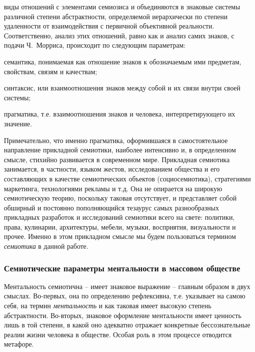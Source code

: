 \begin{enumerate}
  виды отношений с элементами семиозиса и объединяются в знаковые системы различной
  степени абстрактности, определяемой иерархически по степени удаленности от взаимодействия
  с первичной объективной реальности. Соответственно, анализ этих отношений, равно как и анализ
  самих знаков, с подачи Ч.~Морриса, происходит по следующим параметрам:
  \begin{enumerate*}[label=\asbuk*)]
  \item семантика, понимаемая как отношение знаков к обозначаемым ими предметам, свойствам, связям и качествам;
  \item синтаксис, или взаимоотношения знаков между собой и их связи внутри своей системы;
  \item прагматика, т.е. взаимоотношения знаков и человека, интерпретирующего их значение.
  \end{enumerate*}
  Примечательно, что именно прагматика, оформившаяся в самостоятельное направление прикладной
  семиотики, наиболее интенсивно и, в определенном смысле, стихийно развивается в современном мире.
  Прикладная семиотика занимается, в частности, языком жестов, исследованием общества и его
  составляющих в качестве семиотических объектов (социосемиотика), стратегиями маркетинга,
  технологиями рекламы и т.д. Она не опирается на широкую семиотическую теорию, поскольку
  таковая отсутствует, и представляет собой обширный и постоянно пополняющийся тезаурус
  самых разнообразных прикладных разработок и исследований семиотики всего на свете:
  политики, права, кулинарии, архитектуры, мебели, музыки, восприятия, визуальности и прочее.
  Именно в этом прикладном смысле мы будем пользоваться термином \emph{семиотика}
  в данной работе.
\end{enumerate}

\subsubsection{Семиотические параметры ментальности в массовом обществе}\label{1.2}
Ментальность семиотична -- имеет знаковое выражение -- главным образом в двух смыслах.
Во-первых, она по определению рефлексивна, т.е. указывает на самою себя, на термин \emph{ментальность} и
как таковая имеет высокую степень абстрактности. Во-вторых, знаковое оформление ментальности
имеет ценность лишь в той степени, в какой оно адекватно отражает конкретные бессознательные
реалии жизни человека в обществе. Особая роль в этом процессе отводится метафоре.

